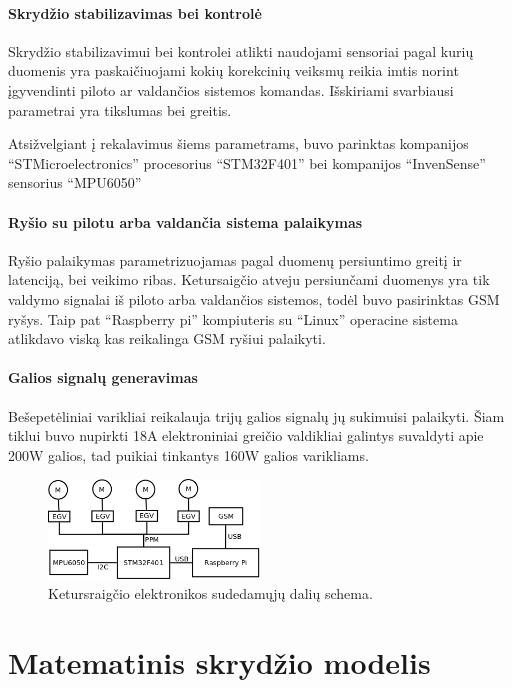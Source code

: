 \documentclass[12pt, a4paper, lithuanian, final]{article}
\begin{document}
\paragraph{Skrydžio stabilizavimas bei kontrolė}
Skrydžio stabilizavimui bei kontrolei atlikti naudojami sensoriai pagal kurių duomenis yra paskaičiuojami kokių korekcinių veiksmų reikia imtis norint įgyvendinti piloto ar valdančios sistemos komandas.
Išskiriami svarbiausi parametrai yra tikslumas bei greitis.

Atsižvelgiant į rekalavimus šiems parametrams, buvo parinktas kompanijos "`STMicroelectronics"' procesorius "`STM32F401"' bei kompanijos "`InvenSense"' sensorius "`MPU6050"'

\paragraph{Ryšio su pilotu arba valdančia sistema palaikymas}
Ryšio palaikymas parametrizuojamas pagal duomenų persiuntimo greitį ir latenciją, bei veikimo ribas.
Ketursaigčio atveju persiunčami duomenys yra tik valdymo signalai iš piloto arba valdančios sistemos, todėl buvo pasirinktas GSM ryšys.
Taip pat "`Raspberry pi"' kompiuteris su "`Linux"' operacine sistema atlikdavo viską kas reikalinga GSM ryšiui palaikyti.

\paragraph{Galios signalų generavimas}
Bešepetėliniai varikliai reikalauja trijų galios signalų jų sukimuisi palaikyti.
Šiam tiklui buvo nupirkti 18A elektroniniai greičio valdikliai galintys suvaldyti apie 200W galios, tad puikiai tinkantys 160W galios varikliams.

\begin{figure}[H]
\begin{center}
\includegraphics[width=0.5\textwidth]{img/elektronikosSchema.png}
\caption{Ketursraigčio elektronikos sudedamųjų dalių schema.}
\end{center}
\end{figure}




\section{Matematinis skrydžio modelis}
\label{skyr-model}
\end{document}
